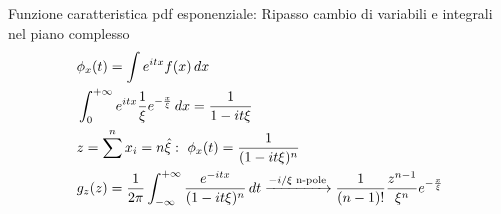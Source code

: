 \begin{wordonframe}{Funzione caratteristica pdf esponenziale: Ripasso cambio di variabili e integrali nel piano complesso}
\begin{align*}
&\phi_x(t)=\int e^{itx}f(x)\,dx\\
&\int_{0}^{+\infty}{}e^{itx}\frac{1}{\xi}e^{-\frac{x}{\xi}}\,dx=\frac{1}{1-it\xi}\\
&z=\sum^nx_i=n\hat{\xi}:\ \phi_x(t)=\frac{1}{(1-it\xi)^n}\\
&g_z(z)=\frac{1}{2\pi}\int_{-\infty}^{+\infty}{}\frac{e^{-itx}}{(1-it\xi)^n}\,dt\xrightarrow{-i/\xi \text{ n-pole}}\frac{1}{(n-1)!}\frac{z^{n-1}}{\xi^n}e^{-\frac{x}{\xi}}\\
\end{align*}
\end{wordonframe}
